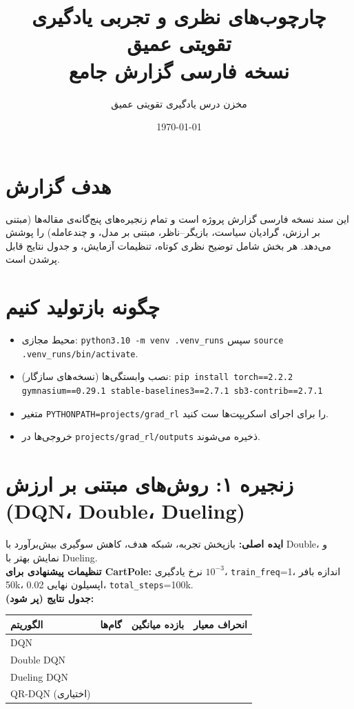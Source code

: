 \documentclass[12pt]{article}
\title{چارچوب‌های نظری و تجربی یادگیری تقویتی عمیق \\ نسخه فارسی گزارش جامع}
\author{مخزن درس یادگیری تقویتی عمیق}
\date{\today}
\begin{document}
\maketitle
\tableofcontents

\section{هدف گزارش}
این سند نسخه فارسی گزارش پروژه است و تمام زنجیره‌های پنج‌گانه‌ی مقاله‌ها (مبتنی بر ارزش، گرادیان سیاست، بازیگر--ناظر، مبتنی بر مدل، و چندعامله) را پوشش می‌دهد. هر بخش شامل توضیح نظری کوتاه، تنظیمات آزمایش، و جدول نتایج قابل پرشدن است.

\section{چگونه بازتولید کنیم}
\begin{itemize}[leftmargin=*]
    \item محیط مجازی: \verb|python3.10 -m venv .venv_runs| سپس \verb|source .venv_runs/bin/activate|.
    \item نصب وابستگی‌ها (نسخه‌های سازگار): \verb|pip install torch==2.2.2 gymnasium==0.29.1 stable-baselines3==2.7.1 sb3-contrib==2.7.1|
    \item متغیر \verb|PYTHONPATH=projects/grad_rl| را برای اجرای اسکریپت‌ها ست کنید.
    \item خروجی‌ها در \verb|projects/grad_rl/outputs| ذخیره می‌شوند.
\end{itemize}

\section{زنجیره ۱: روش‌های مبتنی بر ارزش (DQN، Double، Dueling)}
\textbf{ایده اصلی:} بازپخش تجربه، شبکه هدف، کاهش سوگیری بیش‌برآورد با Double، و نمایش بهتر با Dueling.\\
\textbf{تنظیمات پیشنهادی برای CartPole:} نرخ یادگیری $10^{-3}$، \texttt{train\_freq}=1، اندازه بافر 50k، اپسیلون نهایی 0.02، \texttt{total\_steps}=100k.\\
\textbf{جدول نتایج (پر شود):}
\begin{table}[h]
    \centering
    \begin{tabular}{lccc}
    \toprule
    الگوریتم & گام‌ها & بازده میانگین & انحراف معیار \\
    \midrule
    DQN & & & \\
    Double DQN & & & \\
    Dueling DQN & & & \\
    QR-DQN (اختیاری) & & & \\
    \bottomrule
    \end{tabular}
\end{table}
\end{document}
